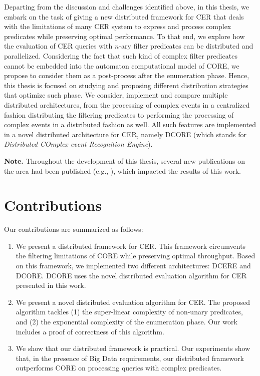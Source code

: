 Departing from the discussion and challenges identified above, in this thesis, we embark on the task of giving a new distributed framework for CER that deals with the limitations of many CER system to express and process complex predicates while preserving optimal performance. To that end, we explore how the evaluation of CER queries with $n$-ary filter predicates can be distributed and parallelized. Considering the fact that such kind of complex filter predicates cannot be embedded into the automaton computational model of CORE, we propose to consider them as a post-process after the enumeration phase. Hence, this thesis is focused on studying and proposing different distribution strategies that optimize such phase. We consider, implement and compare multiple distributed architectures, from the processing of complex events in a centralized fashion distributing the filtering predicates to performing the processing of complex events in a distributed fashion as well. All such features are implemented in a novel distributed architecture for CER, namely DCORE (which stands for \emph{Distributed COmplex event Recognition Engine}).

\textbf{Note.} Throughout the development of this thesis, several new publications on the area had been published (e.g., \cite{formal-framework-cer, core}), which impacted the results of this work.

\section{Contributions}\label{sec:contribution}

Our contributions are summarized as follows:

\begin{enumerate}[label=(\roman*)]
  \item We present a distributed framework for CER. This framework circumvents the filtering limitations of CORE while preserving optimal throughput. Based on this framework, we implemented two different architectures: DCERE and DCORE. DCORE uses the novel distributed evaluation algorithm for CER presented in this work.

  \item We present a novel distributed evaluation algorithm for CER. The proposed algorithm tackles (1) the super-linear complexity of non-unary predicates, and (2) the exponential complexity of the enumeration phase. Our work includes a proof of correctness of this algorithm.

  \item We show that our distributed framework is practical. Our experiments show that, in the presence of Big Data requirements, our distributed framework outperforms CORE on processing queries with complex predicates.
\end{enumerate}

